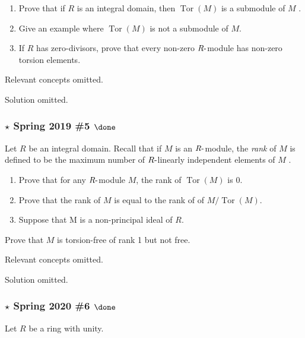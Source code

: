 \begin{enumerate}
\def\labelenumi{\alph{enumi}.}
\item
  Prove that if \(R\) is an integral domain, then
  \(\operatorname{Tor}(M )\) is a submodule of \(M\) .
\item
  Give an example where \(\operatorname{Tor}(M )\) is not a submodule of
  \(M\).
\item
  If \(R\) has zero-divisors, prove that every non-zero
  \(R{\hbox{-}}\)module has non-zero torsion elements.
\end{enumerate}

Relevant concepts omitted.

Solution omitted.

\hypertarget{star-spring-2019-5-done}{%
\subsubsection{\texorpdfstring{\(\star\) Spring 2019 \#5
\(\done\)}{\textbackslash star Spring 2019 \#5 \textbackslash done}}\label{star-spring-2019-5-done}}

Let \(R\) be an integral domain. Recall that if \(M\) is an
\(R{\hbox{-}}\)module, the \emph{rank} of \(M\) is defined to be the
maximum number of \(R{\hbox{-}}\)linearly independent elements of \(M\)
.

\begin{enumerate}
\def\labelenumi{\alph{enumi}.}
\item
  Prove that for any \(R{\hbox{-}}\)module \(M\), the rank of
  \(\operatorname{Tor}(M )\) is 0.
\item
  Prove that the rank of \(M\) is equal to the rank of of
  \(M/\operatorname{Tor}(M )\).
\item
  Suppose that M is a non-principal ideal of \(R\).
\end{enumerate}

Prove that \(M\) is torsion-free of rank 1 but not free.

Relevant concepts omitted.

Solution omitted.

\hypertarget{star-spring-2020-6-done}{%
\subsubsection{\texorpdfstring{\(\star\) Spring 2020 \#6
\(\done\)}{\textbackslash star Spring 2020 \#6 \textbackslash done}}\label{star-spring-2020-6-done}}

Let \(R\) be a ring with unity.

